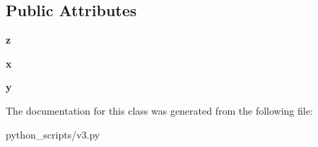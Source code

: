 \subsection*{Public Attributes}
\begin{DoxyCompactItemize}
\item 
\hypertarget{classv3_1_1vec3_a1df675426a46bf6d78ae23844c327061}{}{\bfseries z}\label{classv3_1_1vec3_a1df675426a46bf6d78ae23844c327061}

\item 
\hypertarget{classv3_1_1vec3_a8140d9ed95b6487006ca20342bc96fc0}{}{\bfseries x}\label{classv3_1_1vec3_a8140d9ed95b6487006ca20342bc96fc0}

\item 
\hypertarget{classv3_1_1vec3_a5971d16eae14a2e3e3fb451134a7aff7}{}{\bfseries y}\label{classv3_1_1vec3_a5971d16eae14a2e3e3fb451134a7aff7}

\end{DoxyCompactItemize}


The documentation for this class was generated from the following file\+:\begin{DoxyCompactItemize}
\item 
python\+\_\+scripts/v3.\+py\end{DoxyCompactItemize}
